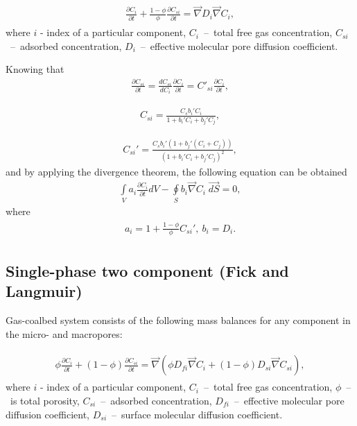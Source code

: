 \documentclass[a4paper,14pt,english]{extreport}
\begin{document}
\begin{eqnarray}
\begin{gathered}
\label{eq:diffusuin_multicomp_diff}
\frac{\partial C_{i}}{\partial t} +  \frac{1 - \phi}{\phi} \frac{\partial C_{si}}{\partial t} = \vec{\nabla} D_{i} \vec{\nabla}C_{i},
\end{gathered}
\end{eqnarray}
where $i$ - index of  a particular component, $C_{i}$~--~total free gas concentration, $C_{si}$~--~adsorbed concentration, $D_{i}$~--~effective molecular pore diffusion coefficient.

Knowing that
\begin{eqnarray}
\label{eq:variable_replace_timeder}
\frac{\partial C_{si}}{\partial t} =  \frac{dC_{si}}{dC_{i}}\frac{\partial C_{i}}{\partial t} = C'_{si}\frac{\partial C_{i}}{\partial t},
\end{eqnarray}

\begin{eqnarray}
\label{eq:conc_sorption}
C_{si} =  \frac{C_{s} b_{i}' C_{i}}{1+b_{i}'C_{i}+b_{j}'C_{j}},
\end{eqnarray}

\begin{eqnarray}
\label{eq:conc_sorption_deriv}
C_{si}' =  \frac{C_{s}b_{i}' \left(1+b_{j}'\left(C_{i}+C_{j}\right)\right)}{\left(1+b_{i}'C_{i}+b_{j}'C_{j}\right)^2},
\end{eqnarray}
and by applying the divergence theorem, the following equation can be obtained
\begin{eqnarray}
\label{eq:diffusuin_multicomp_integral}
\int \limits_{V} a_{i} \frac{\partial C_{i}}{\partial t} dV - \oint \limits_{S} b_{i} \vec{\nabla}C_{i} \; \vec{dS} = 0,
\end{eqnarray}
where
\begin{eqnarray}
\begin{gathered}
\label{eq:alpha}
a_{i}  =  1+\frac{1 - \phi}{\phi}C_{si}', \: b_{i}  = D_{i}.
\end{gathered}
\end{eqnarray}

 \subsection*{Single-phase two component (Fick and Langmuir)}
 Gas-coalbed system consists of the following mass balances for any component in the micro- and macropores:
 
 \begin{eqnarray}
 \begin{gathered}
 \label{eq:diffusuin_multicomp_diff}
  \phi\frac{\partial C_{i}}{\partial t} + \left(1-\phi\right)\frac{\partial C_{si}}{\partial t} = \vec{\nabla} \left(\phi D_{fi} \vec{\nabla}C_{i} + \left(1-\phi \right) D_{si} \vec{\nabla}C_{s i}\right),
   \end{gathered}
 \end{eqnarray}
 where $i$ - index of  a particular component, $C_{i}$~--~total free gas concentration, $\phi$~--~is total porosity, $C_{si}$~--~adsorbed concentration, $D_{fi}$~--~effective molecular pore diffusion coefficient, $D_{si}$~--~surface molecular diffusion coefficient.
 
\end{document}
